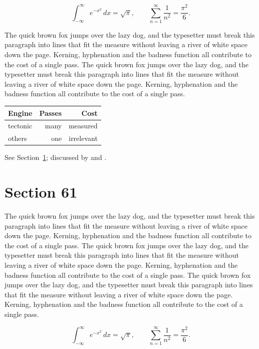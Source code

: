 \documentclass{article}
\begin{document}
\begin{equation}\label{eq:60}
\int_{-\infty}^{\infty} e^{-x^{2}}\,dx = \sqrt{\pi}, \qquad
\sum_{n=1}^{\infty} \frac{1}{n^{2}} = \frac{\pi^{2}}{6}.
\end{equation}

The quick brown fox jumps over the lazy dog, and the typesetter must break this paragraph into lines that fit the measure without leaving a river of white space down the page. Kerning, hyphenation and the badness function all contribute to the cost of a single pass. The quick brown fox jumps over the lazy dog, and the typesetter must break this paragraph into lines that fit the measure without leaving a river of white space down the page. Kerning, hyphenation and the badness function all contribute to the cost of a single pass. 

\begin{center}
\begin{tabular}{lrr}
\toprule
Engine & Passes & Cost \\
\midrule
tectonic & many & measured \\
others & one & irrelevant \\
\bottomrule
\end{tabular}
\end{center}

See Section~\ref{sec:61}; discussed by \textcite{k1} and \textcite{l3}.
\section{Section 61}
\label{sec:61}
The quick brown fox jumps over the lazy dog, and the typesetter must break this paragraph into lines that fit the measure without leaving a river of white space down the page. Kerning, hyphenation and the badness function all contribute to the cost of a single pass. The quick brown fox jumps over the lazy dog, and the typesetter must break this paragraph into lines that fit the measure without leaving a river of white space down the page. Kerning, hyphenation and the badness function all contribute to the cost of a single pass. The quick brown fox jumps over the lazy dog, and the typesetter must break this paragraph into lines that fit the measure without leaving a river of white space down the page. Kerning, hyphenation and the badness function all contribute to the cost of a single pass. 

\begin{equation}\label{eq:61}
\int_{-\infty}^{\infty} e^{-x^{2}}\,dx = \sqrt{\pi}, \qquad
\sum_{n=1}^{\infty} \frac{1}{n^{2}} = \frac{\pi^{2}}{6}.
\end{equation}
\end{document}
